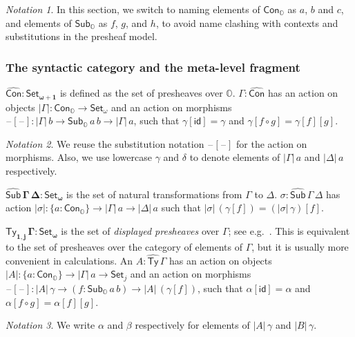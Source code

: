 \documentclass[acmsmall]{acmart}
\newcommand{\msf}[1]{\mathsf{#1}}
\newcommand{\mbb}[1]{\mathbb{#1}}
\newcommand{\bs}[1]{\boldsymbol{#1}}
\newcommand{\wh}[1]{\widehat{#1}}
\newcommand{\mbbo}{\mbb{O}}
\newcommand{\Con}{\msf{Con}}
\newcommand{\Cono}{\msf{Con}_{\mbbo}}
\newcommand{\Subo}{\msf{Sub}_{\mbbo}}
\newcommand{\hSub}{\wh{\msf{Sub}}}
\newcommand{\hTy}{\wh{\msf{Ty}}}
\newcommand{\id}{\msf{id}}
\newcommand{\Set}{\mathsf{Set}}
\newcommand{\blank}{{\mathord{\hspace{1pt}\text{--}\hspace{1pt}}}}
\theoremstyle{remark}
\newtheorem{notation}{Notation}
\begin{document}
\begin{notation}
In this section, we switch to naming elements of $\Cono$ as $a$, $b$ and $c$,
and elements of $\Subo$ as $f$, $g$, and $h$, to avoid name clashing with
contexts and substitutions in the presheaf model.
\end{notation}

\subsubsection{The syntactic category and the meta-level fragment}

\begin{definition} $\bs{\wh{\Con} : \Set_{\omega+1}}$ is defined as the set of presheaves
over $\mbbo$. $\Gamma : \wh{\Con}$ has an action on objects $|\Gamma| :
\Cono \to \Set_\omega$ and an action on morphisms $\blank[\blank] : |\Gamma|\,b
\to \Subo\,a\,b \to |\Gamma|\,a$, such that $\gamma[\id] = \gamma$ and
$\gamma[f\circ g] = \gamma[f][g]$.
\begin{notation}
We reuse the substitution notation $\blank[\blank]$ for the action on morphisms.
Also, we use lowercase $\gamma$ and $\delta$ to denote elements of $|\Gamma|\,a$
and $|\Delta|\,a$ respectively.
\end{notation}
\end{definition}
\begin{definition} $\bs{\hSub\,\Gamma\,\Delta : \Set_\omega}$ is the set of natural transformations
from $\Gamma$ to $\Delta$. $\sigma : \hSub\,\Gamma\,\Delta$ has action
$|\sigma| : \{a : \Cono\} \to |\Gamma|\,a \to |\Delta|\,a$ such that
$|\sigma|\,(\gamma[f]) = (|\sigma|\,\gamma)[f]$.
\end{definition}

\begin{definition}
$\bs{\hTy_{1,j}\,\Gamma : \Set_\omega}$ is the set of \emph{displayed presheaves}
over $\Gamma$; see e.g.\ \cite{TODO}. This is equivalent to the set of
presheaves over the category of elements of $\Gamma$, but it is usually more
convenient in calculations. An $A : \hTy\,\Gamma$ has an action on objects
$|A| : \{a : \Cono\} \to |\Gamma|\,a \to \Set_j$ and an action on
morphisms $\blank[\blank] : |A|\,\gamma \to (f : \Subo\,a\,b) \to
|A|\,(\gamma[f])$, such that $\alpha[\id] = \alpha$ and $\alpha[f \circ g] = \alpha[f][g]$.

\begin{notation}
  We write $\alpha$ and $\beta$ respectively for elements of $|A|\,\gamma$ and
  $|B|\,\gamma$.
\end{notation}
\end{definition}
\end{document}
